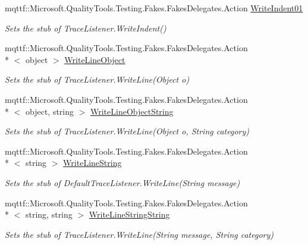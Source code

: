 \begin{DoxyCompactItemize}
mqttf\-::\-Microsoft.\-Quality\-Tools.\-Testing.\-Fakes.\-Fakes\-Delegates.\-Action \hyperlink{class_system_1_1_diagnostics_1_1_fakes_1_1_stub_default_trace_listener_a670734ea7bbeee90f07d5188f5ba6601}{Write\-Indent01}
\begin{DoxyCompactList}\small\item\em Sets the stub of Trace\-Listener.\-Write\-Indent()\end{DoxyCompactList}\item 
mqttf\-::\-Microsoft.\-Quality\-Tools.\-Testing.\-Fakes.\-Fakes\-Delegates.\-Action\\*
$<$ object $>$ \hyperlink{class_system_1_1_diagnostics_1_1_fakes_1_1_stub_default_trace_listener_a3d438e472a7ed9f58d67f8b5cccc609e}{Write\-Line\-Object}
\begin{DoxyCompactList}\small\item\em Sets the stub of Trace\-Listener.\-Write\-Line(\-Object o)\end{DoxyCompactList}\item 
mqttf\-::\-Microsoft.\-Quality\-Tools.\-Testing.\-Fakes.\-Fakes\-Delegates.\-Action\\*
$<$ object, string $>$ \hyperlink{class_system_1_1_diagnostics_1_1_fakes_1_1_stub_default_trace_listener_ac0df66003484e60dc82b01790d184bb7}{Write\-Line\-Object\-String}
\begin{DoxyCompactList}\small\item\em Sets the stub of Trace\-Listener.\-Write\-Line(\-Object o, String category)\end{DoxyCompactList}\item 
mqttf\-::\-Microsoft.\-Quality\-Tools.\-Testing.\-Fakes.\-Fakes\-Delegates.\-Action\\*
$<$ string $>$ \hyperlink{class_system_1_1_diagnostics_1_1_fakes_1_1_stub_default_trace_listener_a78e7fcef4ed92c2405dd26c84dd8a755}{Write\-Line\-String}
\begin{DoxyCompactList}\small\item\em Sets the stub of Default\-Trace\-Listener.\-Write\-Line(\-String message)\end{DoxyCompactList}\item 
mqttf\-::\-Microsoft.\-Quality\-Tools.\-Testing.\-Fakes.\-Fakes\-Delegates.\-Action\\*
$<$ string, string $>$ \hyperlink{class_system_1_1_diagnostics_1_1_fakes_1_1_stub_default_trace_listener_a8e32a8d7f13631c19b04db5881338c00}{Write\-Line\-String\-String}
\begin{DoxyCompactList}\small\item\em Sets the stub of Trace\-Listener.\-Write\-Line(\-String message, String category)\end{DoxyCompactList}\item 

\end{DoxyCompactItemize}
